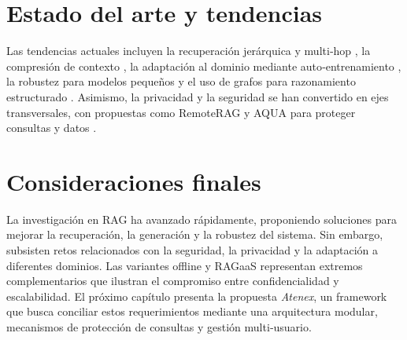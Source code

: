 \section{Estado del arte y tendencias}

Las tendencias actuales incluyen la recuperación jerárquica y multi‑hop \cite{Zhang2025LevelRAG,Wang2025HopRAG}, la compresión de contexto \cite{Li2025BRIEF}, la adaptación al dominio mediante auto‑entrenamiento \cite{Xu2024SimRAGDomain}, la robustez para modelos pequeños \cite{Liu2025RoseRAG} y el uso de grafos para razonamiento estructurado \cite{Han2025GraphRAG}. Asimismo, la privacidad y la seguridad se han convertido en ejes transversales, con propuestas como RemoteRAG y AQUA para proteger consultas y datos \cite{Cheng2025RemoteRAG,Chen2025AQUA}.

\section{Consideraciones finales}

La investigación en RAG ha avanzado rápidamente, proponiendo soluciones para mejorar la recuperación, la generación y la robustez del sistema. Sin embargo, subsisten retos relacionados con la seguridad, la privacidad y la adaptación a diferentes dominios. Las variantes offline y RAGaaS representan extremos complementarios que ilustran el compromiso entre confidencialidad y escalabilidad. El próximo capítulo presenta la propuesta \emph{Atenex}, un framework que busca conciliar estos requerimientos mediante una arquitectura modular, mecanismos de protección de consultas y gestión multi‑usuario.